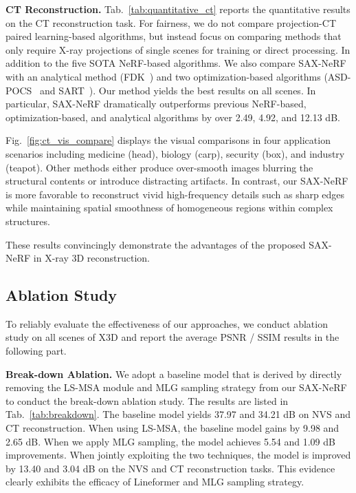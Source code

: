 \documentclass[10pt,twocolumn,letterpaper]{article}
\begin{document}
\vspace{1mm}
\noindent\textbf{CT Reconstruction.} Tab.~\ref{tab:quantitative_ct} reports the quantitative results on the CT reconstruction task. For fairness, we do not compare projection-CT paired learning-based algorithms, but instead focus on comparing methods that only require X-ray projections of single scenes for training or direct processing. In addition to the five SOTA NeRF-based algorithms. We also compare SAX-NeRF with an analytical method (FDK~\cite{fdk}) and two optimization-based algorithms (ASD-POCS~\cite{asd_pocs} and SART~\cite{sart}). Our method yields the best results on all scenes. In particular, SAX-NeRF dramatically outperforms previous NeRF-based, optimization-based, and analytical algorithms by over 2.49, 4.92, and 12.13 dB.

Fig.~\ref{fig:ct_vis_compare} displays the visual comparisons in four application scenarios including medicine (head), biology (carp), security (box), and industry (teapot). Other methods either produce over-smooth images blurring the structural contents or introduce distracting artifacts. In contrast, our SAX-NeRF is more favorable to reconstruct vivid high-frequency details such as sharp edges while maintaining spatial smoothness of homogeneous regions within complex structures.

These results convincingly demonstrate the advantages of the proposed SAX-NeRF in X-ray 3D reconstruction.


\subsection{Ablation Study}


To reliably evaluate the effectiveness of our approaches, we conduct ablation study on all scenes of X3D and report the average PSNR / SSIM results in the following part.

\vspace{0.5mm}
\noindent\textbf{Break-down Ablation.} We adopt a baseline model that is derived by directly removing the LS-MSA module and MLG sampling strategy from our SAX-NeRF to conduct the break-down ablation study. The results are listed in Tab.~\ref{tab:breakdown}. The baseline model yields 37.97 and 34.21 dB on NVS and CT reconstruction. When using LS-MSA, the baseline model gains by 9.98 and 2.65 dB. When we apply MLG sampling, the model achieves 5.54 and 1.09 dB improvements. When jointly exploiting the two techniques, the model is improved by 13.40 and 3.04 dB on the NVS and CT reconstruction tasks. This evidence clearly exhibits the efficacy of Lineformer and MLG sampling strategy.
\end{document}
